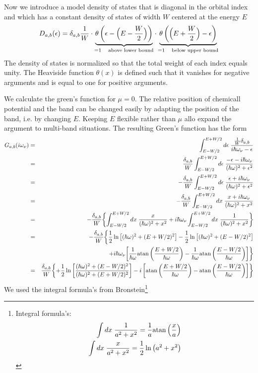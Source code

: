 \documentclass[11pt,a4paper]{report}
\begin{document}
Now we introduce a model density of states that is diagonal in the
orbital index and which has a constant density of states of width $W$
centered at the energy $E$
\begin{eqnarray}
D_{a,b}(\epsilon)=\delta_{a,b}\frac{1}{W}
\cdot
\underbrace{\theta\left(\epsilon-\Bigl(E-\frac{W}{2}\Bigr)\right)
}_{=1\quad\text{above lower bound}}
\cdot\underbrace{
\theta\left(\Bigl(E+\frac{W}{2}\Bigr)-\epsilon\right)
}_{=1\quad\text{below upper bound}}
\end{eqnarray}
The density of states is normalized so that the total weight of each
index equals unity. The Heaviside function $\theta(x)$ is defined such
that it vanishes for negative arguments and is equal to one for
positive arguments.


We calculate the green's function for $\mu=0$. The relative position
of chemicall potential and the band can be changed easily by adapting
the position of the band, i.e. by changing $E$. Keeping $E$ flexible
rather than $\mu$ allo expand the argument to multi-band situations.
The resulting Green's function has the form
\begin{eqnarray}
G_{a,b}(i\omega_\nu)&=&\int_{E-W/2}^{E+W/2} d\epsilon\;
\frac{\frac{1}{W}\delta_{a,b}}{i\hbar\omega_\nu-\epsilon}
\nonumber\\
&=&
\frac{\delta_{a,b}}{W}\int_{E-W/2}^{E+W/2}d\epsilon\;
\frac{-\epsilon-i\hbar\omega_\nu}{(\hbar\omega)^2+\epsilon^2}
\nonumber\\
&=&
-\frac{\delta_{a,b}}{W}\int_{E-W/2}^{E+W/2}d\epsilon\;
\frac{\epsilon+i\hbar\omega_\nu}{(\hbar\omega)^2+\epsilon^2}
\nonumber\\
&=&
-\frac{\delta_{a,b}}{W}\int_{E-W/2}^{E+W/2}dx\;
\frac{x+i\hbar\omega_\nu}{(\hbar\omega)^2+x^2}
\nonumber\\
&=&
-\frac{\delta_{a,b}}{W}
\biggl\lbrace
\int_{E-W/2}^{E+W/2}dx\;
\frac{x}{(\hbar\omega)^2+x^2}
+i\hbar\omega_\nu\int_{E-W/2}^{E+W/2}dx\;
\frac{1}{(\hbar\omega)^2+x^2}
\biggr\rbrace
\nonumber\\
&=&
-\frac{\delta_{a,b}}{W}
\biggl\lbrace
\frac{1}{2}\ln\left[(\hbar\omega)^2+(E+W/2)^2\right]
-\frac{1}{2}\ln\left[(\hbar\omega)^2+(E-W/2)^2\right]
\nonumber\\
&&\hspace{1cm}
 +i\hbar\omega_\nu 
\biggl[
 \frac{1}{\hbar\omega}{\rm atan}\left(\frac{E+W/2}{\hbar\omega}\right)
-\frac{1}{\hbar\omega}{\rm atan}\left(\frac{E-W/2}{\hbar\omega}\right)
\biggr]
\biggr\rbrace
\nonumber\\
&=&
\frac{\delta_{a,b}}{W}
\biggl\lbrace
+\frac{1}{2}\ln\left[
\frac{(\hbar\omega)^2+(E-W/2)^2}{(\hbar\omega)^2+(E+W/2)^2}
\right]
-i \left[{\rm atan}\left(\frac{E+W/2}{\hbar\omega}\right)
-{\rm atan}\left(\frac{E-W/2}{\hbar\omega}\right)\right]
\biggr\rbrace
\nonumber\\
\end{eqnarray}
We used the integral formula's from Bronstein\footnote{Integral formula's:
\begin{eqnarray}
\int dx\;\frac{1}{a^2+x^2}=\frac{1}{a}{\rm atan}\left(\frac{x}{a}\right)
\nonumber\\
\int dx\;\frac{x}{a^2+x^2}=\frac{1}{2}\ln\left(a^2+x^2\right)
\end{eqnarray}
}
\end{document}
